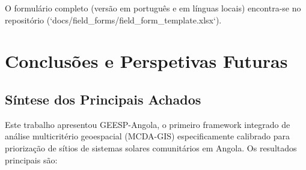 \documentclass[12pt, a4paper]{article}
\begin{document}
O formulário completo (versão em português e em línguas locais) encontra-se no repositório (`docs/field_forms/field_form_template.xlsx`).


\section{Conclusões e Perspetivas Futuras}

\subsection{Síntese dos Principais Achados}

Este trabalho apresentou GEESP-Angola, o primeiro framework integrado de análise multicritério geoespacial (MCDA-GIS) especificamente calibrado para priorização de sítios de sistemas solares comunitários em Angola. Os resultados principais são:
\end{document}
